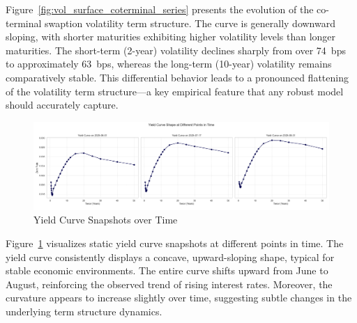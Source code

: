 Figure~\ref{fig:vol_surface_coterminal_series} presents the evolution of the co-terminal swaption volatility term structure. The curve is generally downward sloping, with shorter maturities exhibiting higher volatility levels than longer maturities. The short-term (2-year) volatility declines sharply from over 74~bps to approximately 63~bps, whereas the long-term (10-year) volatility remains comparatively stable. This differential behavior leads to a pronounced flattening of the volatility term structure—a key empirical feature that any robust model should accurately capture.

\begin{figure}[H]
	\centering
	\includegraphics[width=1\textwidth]{images/descriptive_data_analysis/yield_curve_2d_snapshots.png}
	\caption{Yield Curve Snapshots over Time}
	\label{fig:yield_curve_2d_snapshots}
\end{figure}

Figure~\ref{fig:yield_curve_2d_snapshots} visualizes static yield curve snapshots at different points in time. The yield curve consistently displays a concave, upward-sloping shape, typical for stable economic environments. The entire curve shifts upward from June to August, reinforcing the observed trend of rising interest rates. Moreover, the curvature appears to increase slightly over time, suggesting subtle changes in the underlying term structure dynamics.

